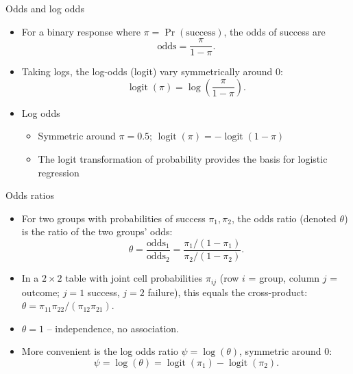 \documentclass[10pt,ignorenonframetext,aspectratio=169]{beamer}
\newcommand{\logit}{\operatorname{logit}}
\begin{document}
\begin{frame}{Odds and log odds}
     \begin{itemize}
         \item For a binary response where $\pi = \Pr(\text{success})$, the odds of success are
         \begin{equation}
             \text{odds} = \frac{\pi}{1-\pi}.
         \end{equation}
         \item Taking logs, the log-odds (logit) vary symmetrically around 0:
         \begin{equation}
             \logit(\pi) = \log\left(\frac{\pi}{1-\pi}\right).
         \end{equation}
         \item Log odds
         \begin{itemize}
             \item Symmetric around $\pi = 0.5$; $\logit(\pi) = -\logit(1-\pi)$
             \item The logit transformation of probability provides the basis for logistic regression
         \end{itemize}
     \end{itemize}
 \end{frame}

 \begin{frame}{Odds ratios}

 \begin{itemize}
     \item For two groups with probabilities of success $\pi_1,\pi_2$, the odds ratio (denoted $\theta$) is the ratio of the two groups' odds:
     \begin{equation}
         \theta = \frac{\text{odds}_{1}}{\text{odds}_{2}} = \frac{\pi_{1}/(1-\pi_{1})}{\pi_{2}/(1-\pi_{2})}.
     \end{equation}
     \item In a $2\times 2$ table with joint cell probabilities $\pi_{ij}$ (row $i$ = group, column $j$ = outcome; $j{=}1$ success, $j{=}2$ failure), this equals the cross-product: $\theta = \pi_{11}\pi_{22}/(\pi_{12}\pi_{21})$.
     \item $\theta = 1$ -- independence, no association.
     \item More convenient is the log odds ratio $\psi = \log(\theta)$, symmetric around 0:
     \begin{equation}
         \psi = \log(\theta) = \logit(\pi_{1}) - \logit(\pi_{2}).
     \end{equation}
\end{itemize}
\end{frame}
\end{document}
